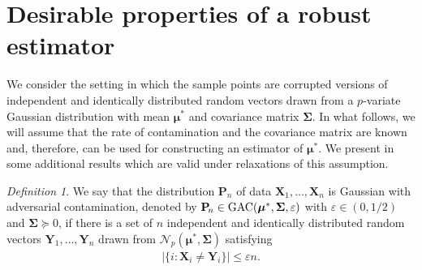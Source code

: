 \documentclass[aos,preprint,reqno]{imsart}
\newcommand\bmu{\boldsymbol\mu}
\newcommand\bSigma{\boldsymbol\Sigma}
\newcommand\bX{\boldsymbol X}
\newcommand\bY{\boldsymbol Y}
\theoremstyle{plain}
\theoremstyle{remark}
\newtheorem{definition}{Definition}
\begin{document}
	\section{Desirable properties of a robust estimator}\label{sec:setting}

	We consider the setting in which the sample points are corrupted versions
	of independent and identically distributed random vectors drawn from
	a $p$-variate Gaussian distribution with mean $\bmu^*$ and covariance 
	matrix $\bSigma$. In what follows, we will assume that the rate of 
	contamination and the covariance matrix are known and, therefore, can
	be used for constructing an estimator of $\bmu^*$. We present in 
	 some additional results which are valid under 
	relaxations of this assumption.

    \def\bfPn{\mathbf P\!_n}
	\begin{definition}\label{def:1}
	We say that the distribution $\bfPn$ of data $\bX_1,\ldots,\bX_n$ 
	is Gaussian with adversarial contamination, denoted by 
	$\bfPn\in \textup{GAC}(\bmu^*,\bSigma,\varepsilon)$ with 
	$\varepsilon\in(0,1/2)$ and $\bSigma\succeq 0$,
	if there is a set of $n$ independent and identically distributed random 
	vectors $\bY_1,\ldots,\bY_n$ drawn from $\mathcal N_p(\bmu^*,\bSigma)$ 
	satisfying
	\begin{align}
	\big|\{i:\bX_i\neq \bY_i \}\big|\le \varepsilon n.
	\end{align}
	\end{definition}
\end{document}
